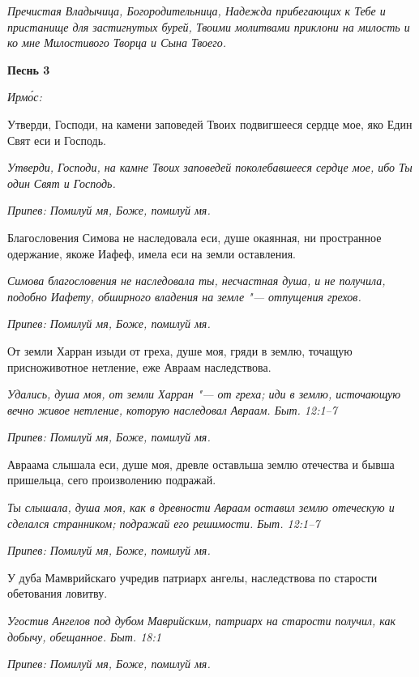 \itshape Пречистая Владычица, Богородительница, Надежда прибегающих к Тебе и пристанище для застигнутых бурей, Твоими молитвами приклони на милость и ко мне Милостивого Творца и Сына Твоего.\normalfont{}





\bfseries Песнь 3\normalfont{}


\itshape Ирмо́с:\normalfont{}


Утверди, Господи, на камени заповедей Твоих подвигшееся сердце мое, яко Един Свят еси и Господь.


\itshape Утверди, Господи, на камне Твоих заповедей поколебавшееся сердце мое, ибо Ты один Свят и Господь.\normalfont{}


\itshape Припев:\normalfont{} Помилуй мя, Боже, помилуй мя.


Благословения Симова не наследовала еси, душе окаянная, ни пространное одержание, якоже Иафеф, имела еси на земли оставления.


\itshape Симова благословения не наследовала ты, несчастная душа, и не получила, подобно Иафету, обширного владения на земле "--- отпущения грехов.\normalfont{}


\itshape Припев:\normalfont{} Помилуй мя, Боже, помилуй мя.


От земли Харран изыди от греха, душе моя, гряди в землю, точащую присноживотное нетление, еже Авраам наследствова.


\itshape Удались, душа моя, от земли Харран "--- от греха; иди в землю, источающую вечно живое нетление, которую наследовал Авраам. Быт. 12:1–7\normalfont{}


\itshape Припев:\normalfont{} Помилуй мя, Боже, помилуй мя.


Авраама слышала еси, душе моя, древле оставльша землю отечества и бывша пришельца, сего произволению подражай.


\itshape Ты слышала, душа моя, как в древности Авраам оставил землю отеческую и сделался странником; подражай его решимости. Быт. 12:1–7\normalfont{}


\itshape Припев:\normalfont{} Помилуй мя, Боже, помилуй мя.


У дуба Мамврийскаго учредив патриарх ангелы, наследствова по старости обетования ловитву.


\itshape Угостив Ангелов под дубом Маврийским, патриарх на старости получил, как добычу, обещанное. Быт. 18:1\normalfont{}


\itshape Припев:\normalfont{} Помилуй мя, Боже, помилуй мя.


